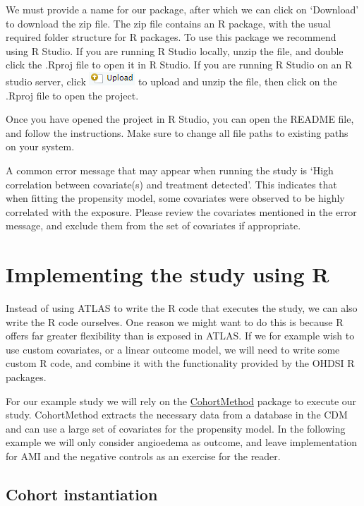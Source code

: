 \documentclass[11pt]{book}
\begin{document}
We must provide a name for our package, after which we can click on
`Download' to download the zip file. The zip file contains an R package,
with the usual required folder structure for R packages.
\citep{Wickham_2015} To use this package we recommend using R Studio. If
you are running R Studio locally, unzip the file, and double click the
.Rproj file to open it in R Studio. If you are running R Studio on an R
studio server, click
\includegraphics{images/PopulationLevelEstimation/upload.png} to upload
and unzip the file, then click on the .Rproj file to open the project.

Once you have opened the project in R Studio, you can open the README
file, and follow the instructions. Make sure to change all file paths to
existing paths on your system.

A common error message that may appear when running the study is `High
correlation between covariate(s) and treatment detected'. This indicates
that when fitting the propensity model, some covariates were observed to
be highly correlated with the exposure. Please review the covariates
mentioned in the error message, and exclude them from the set of
covariates if appropriate.

\section{Implementing the study using
R}\label{implementing-the-study-using-r}

Instead of using ATLAS to write the R code that executes the study, we
can also write the R code ourselves. One reason we might want to do this
is because R offers far greater flexibility than is exposed in ATLAS. If
we for example wish to use custom covariates, or a linear outcome model,
we will need to write some custom R code, and combine it with the
functionality provided by the OHDSI R packages.

For our example study we will rely on the
\href{https://ohdsi.github.io/CohortMethod/}{CohortMethod} package to
execute our study. CohortMethod extracts the necessary data from a
database in the CDM and can use a large set of covariates for the
propensity model. In the following example we will only consider
angioedema as outcome, and leave implementation for AMI and the negative
controls as an exercise for the reader.

\subsection{Cohort instantiation}\label{cohort-instantiation}
\end{document}
